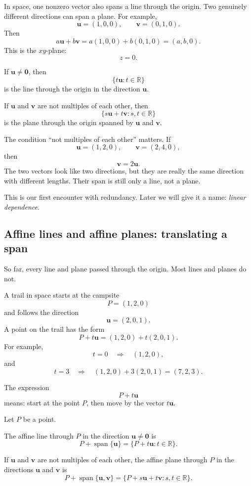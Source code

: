 In space, one nonzero vector also spans a line through the origin.  Two genuinely
different directions can span a plane.  For example,
\[
    \mathbf u=(1,0,0), \qquad \mathbf v=(0,1,0).
\]
Then
\[
    a\mathbf u+b\mathbf v
    =
    a(1,0,0)+b(0,1,0)
    =
    (a,b,0).
\]
This is the \(xy\)-plane:
\[
    z=0.
\]

\begin{definition}
If \(\mathbf u\neq \mathbf 0\), then
\[
    \{t\mathbf u:t\in\mathbb R\}
\]
is the line through the origin in the direction \(\mathbf u\).

If \(\mathbf u\) and \(\mathbf v\) are not multiples of each other, then
\[
    \{s\mathbf u+t\mathbf v:s,t\in\mathbb R\}
\]
is the plane through the origin spanned by \(\mathbf u\) and \(\mathbf v\).
\end{definition}

The condition ``not multiples of each other'' matters.  If
\[
    \mathbf u=(1,2,0), \qquad \mathbf v=(2,4,0),
\]
then
\[
    \mathbf v=2\mathbf u.
\]
The two vectors look like two directions, but they are really the same direction with
different lengths.  Their span is still only a line, not a plane.

This is our first encounter with redundancy.  Later we will give it a name:
\emph{linear dependence}.

\subsection{Affine lines and affine planes: translating a span}

So far, every line and plane passed through the origin.  Most lines and planes do not.

A trail in space starts at the campsite
\[
    P=(1,2,0)
\]
and follows the direction
\[
    \mathbf u=(2,0,1).
\]
A point on the trail has the form
\[
    P+t\mathbf u
    =
    (1,2,0)+t(2,0,1).
\]
For example,
\[
    t=0 \quad \Rightarrow \quad (1,2,0),
\]
and
\[
    t=3 \quad \Rightarrow \quad (1,2,0)+3(2,0,1)=(7,2,3).
\]

The expression
\[
    P+t\mathbf u
\]
means: start at the point \(P\), then move by the vector \(t\mathbf u\).

\begin{definition}
Let \(P\) be a point.

The affine line through \(P\) in the direction \(\mathbf u\neq \mathbf 0\) is
\[
    P+\operatorname{span}\{\mathbf u\}
    =
    \{P+t\mathbf u:t\in\mathbb R\}.
\]

If \(\mathbf u\) and \(\mathbf v\) are not multiples of each other, the affine plane
through \(P\) in the directions \(\mathbf u\) and \(\mathbf v\) is
\[
    P+\operatorname{span}\{\mathbf u,\mathbf v\}
    =
    \{P+s\mathbf u+t\mathbf v:s,t\in\mathbb R\}.
\]
\end{definition}

